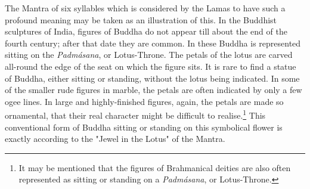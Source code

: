 \documentclass[a4paper, 11pt, oneside, polutonikogreek, english]{article}
\begin{document}
The Mantra of six syllables which is considered by the Lamas to have such a profound meaning may be taken as an illustration of this. In the Buddhist sculptures of India, figures of Buddha do not appear till about the end of the fourth century; after that date they are common. In these Buddha is represented sitting on the \emph{Padmásana}, or Lotus-Throne. The petals of the lotus are carved all-round the edge of the seat on which the figure sits. It is rare to find a statue of Buddha, either sitting or standing, without the lotus being indicated. In some of the smaller rude figures in marble, the petals are often indicated by only a few ogee lines. In large and highly-finished figures, again, the petals are made so ornamental, that their real character might be difficult to realise.\footnote{It may be mentioned that the figures of Brahmanical deities are also often represented as sitting or standing on a \emph{Padmásana}, or Lotus-Throne.} This conventional form of Buddha sitting or standing on this symbolical flower is exactly according to the "Jewel in the Lotus" of the Mantra.
\end{document}
